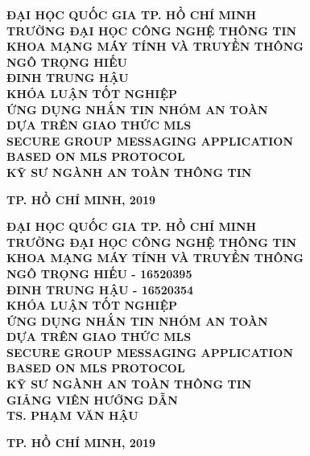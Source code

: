 \documentclass[../main-report.tex]{subfiles}
\begin{document}
\begin{titlepage}
\thispagestyle{empty}
\thisfancypage{
\setlength{\fboxsep}{3pt}
\fbox}{} 
\begin{center}
{\bf\large ĐẠI HỌC QUỐC GIA TP. HỒ CHÍ MINH}\\
{\bf\subtitlesize TRƯỜNG ĐẠI HỌC CÔNG NGHỆ THÔNG TIN}\\
{\bf\subtitlesize KHOA MẠNG MÁY TÍNH VÀ TRUYỀN THÔNG}\\[2.5cm]

{\bf\large NGÔ TRỌNG HIẾU}\\
{\bf\large ĐINH TRUNG HẬU}\\[2.5cm]

{\bf\large KHÓA LUẬN TỐT NGHIỆP}\\[0.5cm]
{\bf\Large ỨNG DỤNG NHẮN TIN NHÓM AN TOÀN}\\
{\bf\Large DỰA TRÊN GIAO THỨC MLS}\\[0.7cm]

{\bf\Large SECURE GROUP MESSAGING APPLICATION}\\
{\bf\Large BASED ON MLS PROTOCOL}\\[3cm]
{\bf\large KỸ SƯ NGÀNH AN TOÀN THÔNG TIN}\\[2cm]

\end{center}

\vspace{6cm}
\begin{center}
{\bf TP. HỒ CHÍ MINH, 2019}
\end{center}
\newpage

\thispagestyle{empty}
\thisfancypage{
\setlength{\fboxsep}{3pt}
\fbox}{} 
\begin{center}
{\bf\large ĐẠI HỌC QUỐC GIA TP. HỒ CHÍ MINH}\\
{\bf\subtitlesize TRƯỜNG ĐẠI HỌC CÔNG NGHỆ THÔNG TIN}\\
{\bf\subtitlesize KHOA MẠNG MÁY TÍNH VÀ TRUYỀN THÔNG}\\[3cm]

{\bf\large NGÔ TRỌNG HIẾU - 16520395}\\
{\bf\large ĐINH TRUNG HẬU - 16520354}\\[3cm]

{\bf\large KHÓA LUẬN TỐT NGHIỆP}\\[0.5cm]
{\bf\Large ỨNG DỤNG NHẮN TIN NHÓM AN TOÀN}\\
{\bf\Large DỰA TRÊN GIAO THỨC MLS}\\[0.5cm]

{\bf\Large SECURE GROUP MESSAGING APPLICATION}\\
{\bf\Large BASED ON MLS PROTOCOL}\\[2cm]

{\bf\large KỸ SƯ NGÀNH AN TOÀN THÔNG TIN}\\[2cm]
{\bf\large GIẢNG VIÊN HƯỚNG DẪN}\\
{\bf\large TS. PHẠM VĂN HẬU}
\end{center}

\vspace{5cm}
\begin{center}
{\bf TP. HỒ CHÍ MINH, 2019}
\end{center}
\end{titlepage}
\end{document}
